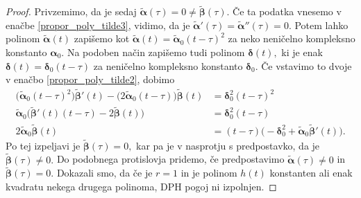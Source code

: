 \documentclass[12pt,a4paper,twoside]{article}
\theoremstyle{definition} %
\theoremstyle{plain} %
\numberwithin{equation}{section}  %
\newcommand{\balpha}{\boldsymbol \alpha}
\newcommand{\bdelta}{\boldsymbol \delta}
\newcommand{\btalpha}{\tilde{\boldsymbol \alpha}}
\newcommand{\btbeta}{\tilde{\boldsymbol \beta}}
\begin{document}
\begin{proof}
	Privzemimo, da je sedaj $\btalpha(\tau)=0\neq\btbeta(\tau).$ Če ta podatka vnesemo v enačbe \eqref{propor_poly_tilde3}, vidimo, da je $\btalpha'(\tau)=\btalpha''(\tau)=0.$ Potem lahko polinom $\btalpha(t)$ zapišemo kot $\btalpha(t)=\btalpha_0(t-\tau)^2$ za neko neničelno kompleksno konstanto $\balpha_0.$ Na podoben način zapišemo tudi polinom $\bdelta(t),$ ki je enak $\bdelta(t)=\bdelta_0(t-\tau)$ za neničelno kompleksno konstanto $\bdelta_0.$ Če vstavimo to dvoje v enačbo \eqref{propor_poly_tilde2}, dobimo
	\begin{align*}
		\big(\btalpha_0(t-\tau)^2\big)\btbeta'(t)-\big(2\btalpha_0(t-\tau)\big)\btbeta(t)&=\bdelta_0^2(t-\tau)^2\\
		\btalpha_0\big(\btbeta'(t)(t-\tau)-2\btbeta(t)\big)&=\bdelta_0^2(t-\tau)\\
		2\btalpha_0\btbeta(t)&=(t-\tau)\big(-\bdelta_0^2+\btalpha_0\btbeta'(t)\big).
	\end{align*}
	Po tej izpeljavi je $\btbeta(\tau)=0,$ kar pa je v nasprotju s predpostavko, da je $\btbeta(\tau)\neq0.$ Do podobnega protislovja pridemo, če predpostavimo $\btalpha(\tau)\neq0$ in $\btbeta(\tau)=0.$ Dokazali smo, da če je $r=1$ in je polinom $h(t)$ konstanten ali enak kvadratu nekega drugega polinoma, DPH pogoj ni izpolnjen.
\end{proof}
\end{document}

